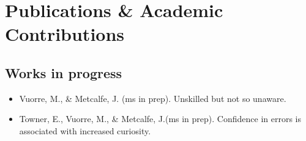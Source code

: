 \documentclass[12pt, a4paper]{article}
\begin{document}
\section*{Publications \& Academic Contributions}

\subsection*{Works in progress}
\begin{itemize}
\item Vuorre, M., \& Metcalfe, J. (ms in prep). Unskilled but not so unaware.
\item Towner, E.\footnotemark[1], Vuorre, M.\footnotemark[1], \& Metcalfe, J.\footnotemark[1] (ms in prep). Confidence in errors is associated with increased curiosity.
\end{itemize}

\end{document}

